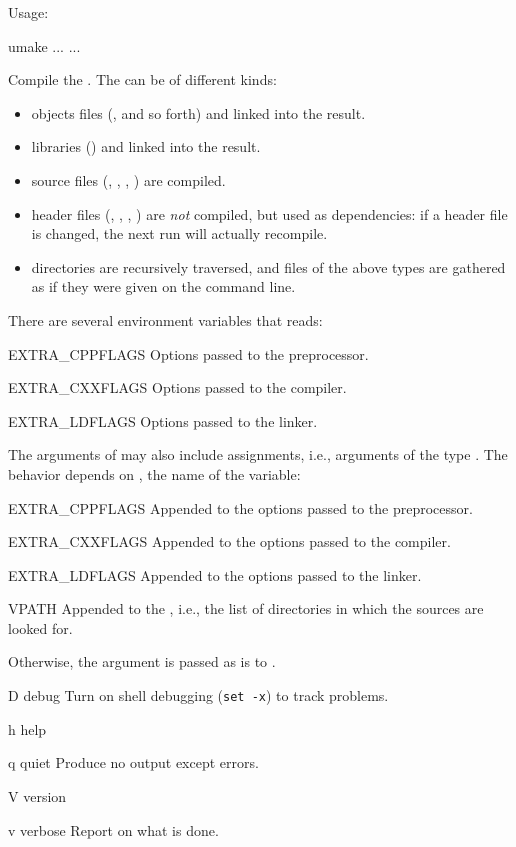 Usage:
\begin{shell}
umake ... ...
\end{shell}

Compile the .  The  can be of different kinds:
\begin{itemize}
\item objects files (,  and so forth) and linked
  into the result.
\item libraries () and linked into the result.
\item source files (, , , )
  are compiled.
\item header files (, , ,
  ) are \emph{not} compiled, but used as dependencies: if
  a header file is changed, the next  run will actually
  recompile.
\item directories are recursively traversed, and files of the above
  types are gathered as if they were given on the command line.
\end{itemize}

There are several environment variables that  reads:
\begin{envs}
\item[EXTRA\_CPPFLAGS] Options passed to the preprocessor.
\item[EXTRA\_CXXFLAGS] Options passed to the \Cxx compiler.
\item[EXTRA\_LDFLAGS] Options passed to the linker.
\end{envs}

The arguments of  may also include assignments, i.e.,
arguments of the type .  The behavior depends on
, the name of the variable:
\begin{envs}
\item[EXTRA\_CPPFLAGS] Appended to the options passed to the preprocessor.
\item[EXTRA\_CXXFLAGS] Appended to the options passed to the \Cxx compiler.
\item[EXTRA\_LDFLAGS]  Appended to the options passed to the linker.
\item[VPATH] Appended to the , i.e., the list of directories in
  which the sources are looked for.
\end{envs}
\noindent
Otherwise, the argument is passed as is to .

\begin{options}
\item[D]{debug} Turn on shell debugging (\lstinline|set -x|) to
  track  problems.
\item[h]{help} \optionHelp
\item[q]{quiet} Produce no output except errors.
\item[V]{version} \optionVersion
\item[v]{verbose} Report on what is done.
\end{options}

